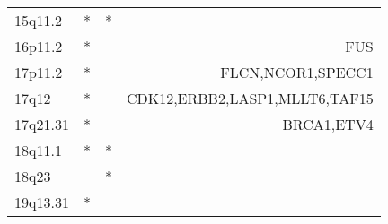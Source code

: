 \begin{tabular}{lccr}
15q11.2  &         * &       * &                                 \\
16p11.2  &         * &         &                             FUS \\
17p11.2  &         * &         &               FLCN,NCOR1,SPECC1 \\
17q12    &         * &         &   CDK12,ERBB2,LASP1,MLLT6,TAF15 \\
17q21.31 &         * &         &                      BRCA1,ETV4 \\
18q11.1  &         * &       * &                                 \\
18q23    &           &       * &                                 \\
19q13.31 &         * &         &                                 \\
\bottomrule
\end{tabular}
